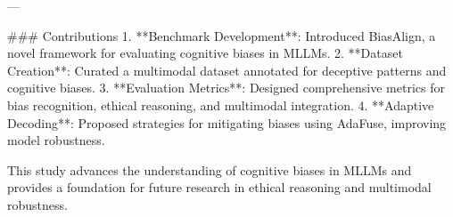 ---

### Contributions  
1. **Benchmark Development**: Introduced BiasAlign, a novel framework for evaluating cognitive biases in MLLMs.
2. **Dataset Creation**: Curated a multimodal dataset annotated for deceptive patterns and cognitive biases.
3. **Evaluation Metrics**: Designed comprehensive metrics for bias recognition, ethical reasoning, and multimodal integration.
4. **Adaptive Decoding**: Proposed strategies for mitigating biases using AdaFuse, improving model robustness.

This study advances the understanding of cognitive biases in MLLMs and provides a foundation for future research in ethical reasoning and multimodal robustness.